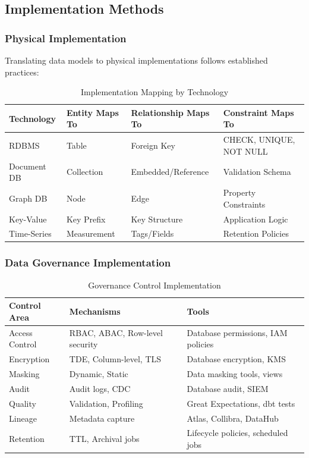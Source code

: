 \documentclass[11pt,letterpaper]{article}
\begin{document}
\subsection{Implementation Methods}

\subsubsection{Physical Implementation}

Translating data models to physical implementations follows established practices:

\begin{table}[H]
\centering
\caption{Implementation Mapping by Technology}
\small
\begin{tabular}{@{}L{2.5cm}L{2.5cm}L{4cm}L{4cm}@{}}
\toprule
\textbf{Technology} & \textbf{Entity Maps To} & \textbf{Relationship Maps To} & \textbf{Constraint Maps To} \\
\midrule
RDBMS & Table & Foreign Key & CHECK, UNIQUE, NOT NULL \\
Document DB & Collection & Embedded/Reference & Validation Schema \\
Graph DB & Node & Edge & Property Constraints \\
Key-Value & Key Prefix & Key Structure & Application Logic \\
Time-Series & Measurement & Tags/Fields & Retention Policies \\
\bottomrule
\end{tabular}
\end{table}

\subsubsection{Data Governance Implementation}

\begin{table}[H]
\centering
\caption{Governance Control Implementation}
\small
\begin{tabular}{@{}L{3cm}L{4cm}L{6cm}@{}}
\toprule
\textbf{Control Area} & \textbf{Mechanisms} & \textbf{Tools} \\
\midrule
Access Control & RBAC, ABAC, Row-level security & Database permissions, IAM policies \\
Encryption & TDE, Column-level, TLS & Database encryption, KMS \\
Masking & Dynamic, Static & Data masking tools, views \\
Audit & Audit logs, CDC & Database audit, SIEM \\
Quality & Validation, Profiling & Great Expectations, dbt tests \\
Lineage & Metadata capture & Atlas, Collibra, DataHub \\
Retention & TTL, Archival jobs & Lifecycle policies, scheduled jobs \\
\bottomrule
\end{tabular}
\end{table}
\end{document}
